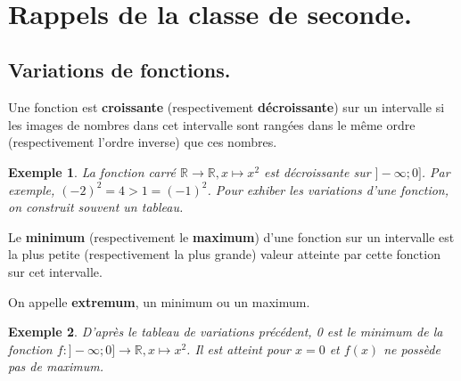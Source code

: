 \documentclass[a4paper,11pt]{article}
\title{}
\author{}
\date{}
\newcommand{\R}{\mathbb{R}}
\theoremstyle{break}
\newtheorem{exemple}{Exemple}
\newcounter{numero}
\newcommand{\exo}{
  \addtocounter{numero}{1}%
  \textbf{\underline{Exercice \arabic{numero}:}}\quad}
\begin{document}
  \setlength{\unitlength}{1mm}
  \setlength\parindent{0mm}
  
  
  ~
  \medskip
  
  \section{Rappels de la classe de seconde.}
  
  \subsection{Variations de fonctions.}
  
  \begin{Def}
    Une fonction est \textbf{croissante} (respectivement \textbf{décroissante}) sur un
    intervalle si les images de nombres dans cet intervalle sont rangées dans le même
    ordre (respectivement l'ordre inverse) que ces nombres.
  \end{Def}
  
  \begin{exemple}
    La fonction carré $\R \to \R, x \mapsto x^2$ est décroissante sur $]-\infty;0]$. 
    Par exemple, $(-2)^2=4>1=(-1)^2$. Pour exhiber les variations d'une fonction, 
    on construit souvent un tableau.
    
  \end{exemple}
  
  
  
  \begin{Def}
    Le \textbf{minimum} (respectivement le \textbf{maximum}) d’une fonction
    sur un intervalle est la plus petite (respectivement la plus grande) 
    valeur atteinte par cette fonction sur cet intervalle.
    
    On appelle \textbf{extremum}, un minimum ou un maximum.
  \end{Def}
  
  \begin{exemple}
    D'après le tableau de variations précédent, 0 est le minimum de la fonction
    $f:]-\infty ; 0] \to \R, x \mapsto x^2$. Il est atteint pour $x=0$ et $f(x)$
    ne possède pas de maximum.
  \end{exemple}
     
\end{document}

